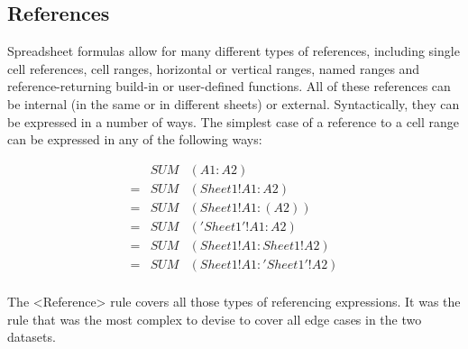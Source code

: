 \documentclass[conference]{IEEEtran}
\begin{document}
\subsection{References}
 
Spreadsheet formulas allow for many different types of references, including single cell references, cell ranges, horizontal or vertical ranges, named ranges and reference-returning build-in or user-defined functions. All of these references can be internal (in the same or in different sheets) or external. Syntactically, they can be expressed in a number of ways. The simplest case of a reference to a cell range can be expressed in any of the following ways:

\begin{eqnarray*}
&SUM&(A1:A2) \\
= &SUM&(Sheet1!A1:A2) \\
= &SUM&(Sheet1!A1:(A2)) \\
= &SUM&('Sheet1'!A1:A2) \\
= &SUM&(Sheet1!A1:Sheet1!A2) \\
= &SUM&(Sheet1!A1:'Sheet1'!A2) \\
\end{eqnarray*}

The <Reference> rule covers all those types of referencing expressions. It was the rule that was the most complex to devise to cover all edge cases in the two datasets.
\end{document}
